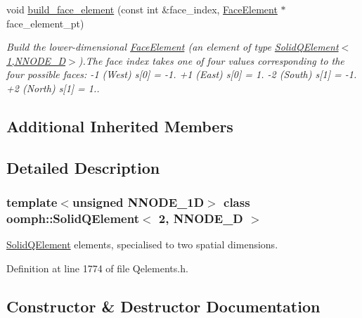 \begin{DoxyCompactItemize}
void \hyperlink{classoomph_1_1SolidQElement_3_012_00_01NNODE__1D_01_4_a26a18f9d58856a414152dfe588c0218d}{build\+\_\+face\+\_\+element} (const int \&face\+\_\+index, \hyperlink{classoomph_1_1FaceElement}{Face\+Element} $\ast$face\+\_\+element\+\_\+pt)
\begin{DoxyCompactList}\small\item\em Build the lower-\/dimensional \hyperlink{classoomph_1_1FaceElement}{Face\+Element} (an element of type \hyperlink{classoomph_1_1SolidQElement_3_011_00_01NNODE__1D_01_4}{Solid\+Q\+Element$<$1,\+N\+N\+O\+D\+E\+\_\+D$>$}).The face index takes one of four values corresponding to the four possible faces\+: -\/1 (West) s\mbox{[}0\mbox{]} = -\/1. +1 (East) s\mbox{[}0\mbox{]} = 1. -\/2 (South) s\mbox{[}1\mbox{]} = -\/1. +2 (North) s\mbox{[}1\mbox{]} = 1.. \end{DoxyCompactList}\end{DoxyCompactItemize}
\subsection*{Additional Inherited Members}


\subsection{Detailed Description}
\subsubsection*{template$<$unsigned N\+N\+O\+D\+E\+\_\+1D$>$\newline
class oomph\+::\+Solid\+Q\+Element$<$ 2, N\+N\+O\+D\+E\+\_\+D $>$}

\hyperlink{classoomph_1_1SolidQElement}{Solid\+Q\+Element} elements, specialised to two spatial dimensions. 

Definition at line 1774 of file Qelements.\+h.



\subsection{Constructor \& Destructor Documentation}
\mbox{\label{classoomph_1_1SolidQElement_3_012_00_01NNODE__1D_01_4_af7284d96e93832ca0dc1b17799c576c1}} 
